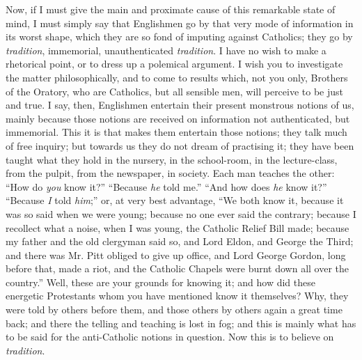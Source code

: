 Now, if I must give the main and proximate cause of
this remarkable state of mind, I must simply say that
Englishmen go by that very mode of information in its
worst shape, which they are so fond of imputing against
Catholics; they go by \emph{tradition}, immemorial,
unauthenticated \emph{tradition}. I have no wish to
make a rhetorical point, or to dress up a polemical
argument. I wish you to investigate the matter
philosophically, and to come to results which, not you
only, Brothers of the Oratory, who are Catholics, but all
sensible men, will perceive to be just and true. I say,
then, Englishmen entertain their present monstrous
notions of us, mainly because those notions are received
on information not authenticated, but immemorial. This it
is that makes them entertain those notions; they talk
much of free inquiry; but towards us they do not dream of
practising it; they have been taught what they hold in
the nursery, in the school-room, in the lecture-class,
from the pulpit, from the newspaper, in society. Each man
teaches the other: ``How do \emph{you} know
it?'' ``Because \emph{he} told me.''
``And how does \emph{he} know it?''
``Because \emph{I} told \emph{him};'' or, at very best advantage, ``We both know it, because it
was so said when we were young; because no one ever said
the contrary; because I recollect what a noise, when I
was young, the Catholic Relief Bill made; because my
father and the old clergyman said so, and Lord Eldon, and
George the Third; and there was Mr. Pitt obliged to give
up office, and Lord George Gordon, long before that, made
a riot, and the Catholic Chapels were burnt down all over
the country.'' Well, these are your grounds for
knowing it; and how did these energetic Protestants whom
you have mentioned know it themselves? Why, they were
told by others before them, and those others by others
again a great time back; and there the telling and
teaching is lost in fog; and this is mainly what has to
be said for the anti-Catholic notions in question. Now
this is to believe on \emph{tradition}.

